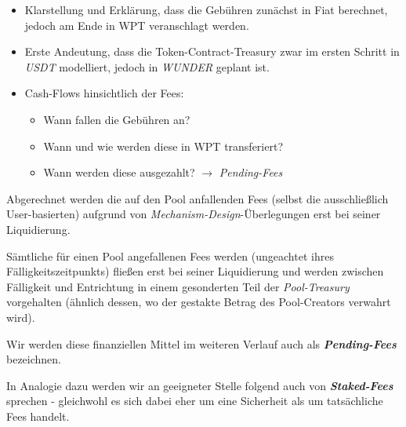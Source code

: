 \begin{itemize}
	\item Klarstellung und Erklärung, dass die Gebühren zunächst in Fiat berechnet, jedoch am Ende in WPT veranschlagt werden.
	\item Erste Andeutung, dass die Token-Contract-Treasury zwar im ersten Schritt in \textit{USDT} modelliert, jedoch in \textit{WUNDER} geplant ist.
	\item Cash-Flows hinsichtlich der Fees:
	\begin{itemize}
		\item Wann fallen die Gebühren an? 
		\item Wann und wie werden diese in WPT transferiert? 
		\item Wann werden diese ausgezahlt? $\rightarrow$ \textit{Pending-Fees}
	\end{itemize}
\end{itemize}

\vspace{0.5cm}

Abgerechnet werden die auf den Pool anfallenden Fees (selbst die ausschließlich User-basierten) aufgrund von \textit{Mechanism-Design}-Überlegungen erst bei seiner Liquidierung.

\vspace{0.3cm}

\begin{Praemisse}[Abrechnung]

Sämtliche für einen Pool angefallenen Fees werden (ungeachtet ihres Fälligkeitszeit\-punkts) fließen erst bei seiner Liquidierung und werden zwischen Fälligkeit und Entrichtung in einem gesonderten Teil der \textit{Pool-Treasury} vorgehalten (ähnlich dessen, wo der gestakte Betrag des Pool-Creators verwahrt wird).

\vspace{0.2cm}

Wir werden diese finanziellen Mittel im weiteren Verlauf auch als \textbf{\textit{Pending-Fees}} bezeichnen.

\vspace{0.2cm}

In Analogie dazu werden wir an geeigneter Stelle folgend auch von \textbf{\textit{Staked-Fees}} sprechen - gleichwohl es sich dabei eher um eine Sicherheit als um tatsächliche Fees handelt.

\end{Praemisse}

\vspace{0.5cm}

